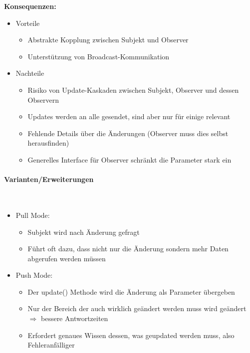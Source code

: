 \documentclass[ngerman,color=3b]{tuda_summary}
\begin{document}
\clearpage
\textbf{Konsequenzen:}
\begin{itemize}
    \item Vorteile
          \begin{itemize}
              \item Abstrakte Kopplung zwischen Subjekt und Observer
              \item Unterstützung von Broadcast-Kommunikation
          \end{itemize}
    \item Nachteile
          \begin{itemize}
              \item Risiko von Update-Kaskaden zwischen Subjekt, Observer und dessen Observern
              \item Updates werden an alle gesendet, sind aber nur für einige relevant
              \item Fehlende Details über die Änderungen (Observer muss dies selbst herausfinden)
              \item Generelles Interface für Observer schränkt die Parameter stark ein
          \end{itemize}
\end{itemize}

\paragraph{Varianten/Erweiterungen}\mbox{}\\
\begin{itemize}
    \item Pull Mode:\begin{itemize}
              \item Subjekt wird nach Änderung gefragt
              \item Führt oft dazu, dass nicht nur die Änderung sondern mehr Daten abgerufen werden müssen
          \end{itemize}
    \item Push Mode:\begin{itemize}
              \item Der update() Methode wird die Änderung als Parameter übergeben
              \item Nur der Bereich der auch wirklich geändert werden muss wird geändert $\Rightarrow$ bessere Antwortzeiten
              \item Erfordert genaues Wissen dessen, was geupdated werden muss, also Fehleranfälliger
          \end{itemize}
\end{itemize}
\end{document}
